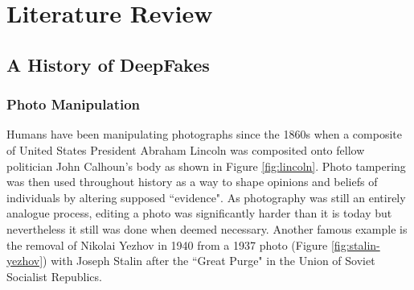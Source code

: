 \chapter{Literature Review}
\label{ch:background}

\section{A History of DeepFakes}


\subsection{Photo Manipulation}

Humans have been manipulating photographs since the 1860s when a composite of United States President Abraham Lincoln was composited onto fellow politician John Calhoun's body\cite{singh2018art} as shown in Figure \ref{fig:lincoln}. Photo tampering was then used throughout history as a way to shape opinions and beliefs of individuals by altering supposed ``evidence". As photography was still an entirely analogue process, editing a photo was significantly harder than it is today but nevertheless it still was done when deemed necessary. Another famous example is the removal of Nikolai Yezhov in 1940 from a 1937 photo (Figure \ref{fig:stalin-yezhov}) with Joseph Stalin after the ``Great Purge" in the Union of Soviet Socialist Republics.

